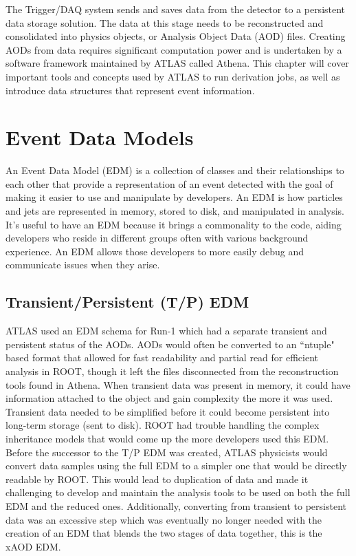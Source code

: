 The Trigger/DAQ system sends and saves data from the detector to a persistent data storage solution.
The data at this stage needs to be reconstructed and consolidated into physics objects, or Analysis Object Data (AOD) files.
Creating AODs from data requires significant computation power and is undertaken by a software framework maintained by ATLAS called Athena.
This chapter will cover important tools and concepts used by ATLAS to run derivation jobs, as well as introduce data structures that represent event information. 

\section{Event Data Models} \label{sec:IO_EDM}
An Event Data Model (EDM) is a collection of classes and their relationships to each other that provide a representation of an event detected with the goal of making it easier to use and manipulate by developers.
An EDM is how particles and jets are represented in memory, stored to disk, and manipulated in analysis.
It's useful to have an EDM because it brings a commonality to the code, aiding developers who reside in different groups often with various background experience.
An EDM allows those developers to more easily debug and communicate issues when they arise.  

\subsection{Transient/Persistent (T/P) EDM}
ATLAS used an EDM schema for Run-1 which had a separate transient and persistent status of the AODs.
AODs would often be converted to an ``ntuple" based format that allowed for fast readability and partial read for efficient analysis in ROOT, though it left the files disconnected from the reconstruction tools found in Athena.\cite{Athena_xAOD_design}
When transient data was present in memory, it could have information attached to the object and gain complexity the more it was used.
Transient data needed to be simplified before it could become persistent into long-term storage (sent to disk). 
ROOT had trouble handling the complex inheritance models that would come up the more developers used this EDM. 
Before the successor to the T/P EDM was created, ATLAS physicists would convert data samples using the full EDM to a simpler one that would be directly readable by ROOT.
This would lead to duplication of data and made it challenging to develop and maintain the analysis tools to be used on both the full EDM and the reduced ones.
Additionally, converting from transient to persistent data was an excessive step which was eventually no longer needed with the creation of an EDM that blends the two stages of data together, this is the xAOD EDM.


